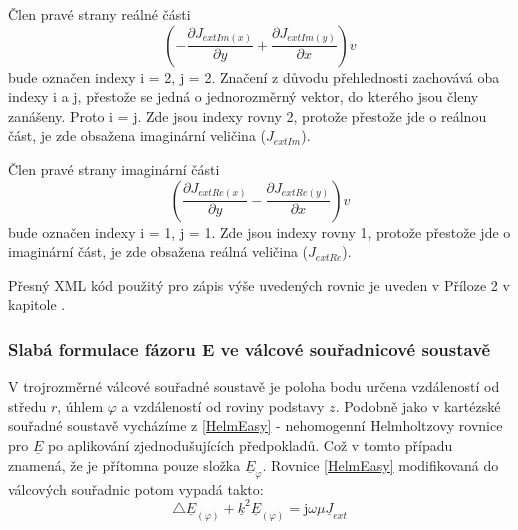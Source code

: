 \documentclass[12pt,a4paper,oneside]{article}
\numberwithin{equation}{section} %
\numberwithin{figure}{section} %
\numberwithin{table}{section} %
\newcommand{\mj}{\mathrm{j}} %
\newcommand{\faz}[1]{{\underline{#1}}} %
\begin{document}
Člen pravé strany reálné části
\begin{equation}
\left( - \frac{\partial J _{extIm(x)}}{\partial y} + \frac{\partial J _{extIm(y)}}{\partial x} \right) v
\end{equation}
bude označen indexy i = 2, j = 2. Značení z důvodu přehlednosti zachovává oba indexy i a j, přestože se jedná o jednorozměrný vektor, do kterého jsou členy zanášeny. Proto i = j. Zde jsou indexy rovny 2, protože přestože jde o reálnou část, je zde obsažena imaginární veličina ($J _{extIm}$).

Člen pravé strany imaginární části
\begin{equation}
\left(\frac{\partial J _{extRe(x)}}{\partial y} - \frac{\partial J _{extRe(y)}}{\partial x} \right)  v
\end{equation}
bude označen indexy i = 1, j = 1. Zde jsou indexy rovny 1, protože přestože jde o imaginární část, je zde obsažena reálná veličina ($J _{extRe}$).

Přesný XML kód použitý pro zápis výše uvedených rovnic je uveden v Příloze 2 v kapitole .


\subsubsection{Slabá formulace fázoru E ve válcové souřadnicové soustavě}

V trojrozměrné válcové souřadné soustavě je poloha bodu určena vzdáleností od středu $r$, úhlem $\varphi$ a vzdáleností od roviny podstavy $z$. Podobně jako v kartézské souřadné soustavě vycházíme z \ref{HelmEasy} - nehomogenní Helmholtzovy rovnice pro $\faz{E}$ po aplikování zjednodušujících předpokladů. Což v tomto případu znamená, že je přítomna pouze složka $\faz{E} _{\varphi}$. Rovnice \ref{HelmEasy} modifikovaná do válcových souřadnic potom vypadá takto:
\begin{equation}
\triangle \faz{E} _{(\varphi)} + \faz{k} ^2 \faz{E} _{(\varphi)} = \mj \omega \mu \faz{J} _{ext} 
\end{equation}
\end{document}
